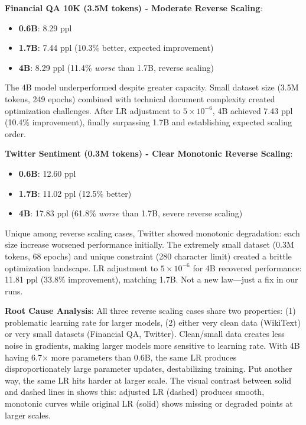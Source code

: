 \textbf{Financial QA 10K (3.5M tokens) - Moderate Reverse Scaling}:
\begin{itemize}
\item \textbf{0.6B}: 8.29 ppl
\item \textbf{1.7B}: 7.44 ppl (10.3\% better, expected improvement)
\item \textbf{4B}: 8.29 ppl (11.4\% \textit{worse} than 1.7B, reverse scaling)
\end{itemize}

The 4B model underperformed despite greater capacity. Small dataset size (3.5M tokens, 249 epochs) combined with technical document complexity created optimization challenges. After LR adjustment to $5 \times 10^{-6}$, 4B achieved 7.43 ppl (10.4\% improvement), finally surpassing 1.7B and establishing expected scaling order.

\textbf{Twitter Sentiment (0.3M tokens) - Clear Monotonic Reverse Scaling}:
\begin{itemize}
\item \textbf{0.6B}: 12.60 ppl
\item \textbf{1.7B}: 11.02 ppl (12.5\% better)
\item \textbf{4B}: 17.83 ppl (61.8\% \textit{worse} than 1.7B, severe reverse scaling)
\end{itemize}

Unique among reverse scaling cases, Twitter showed monotonic degradation: each size increase worsened performance initially. The extremely small dataset (0.3M tokens, 68 epochs) and unique constraint (280 character limit) created a brittle optimization landscape. LR adjustment to $5 \times 10^{-6}$ for 4B recovered performance: 11.81 ppl (33.8\% improvement), matching 1.7B. Not a new law—just a fix in our runs.

\textbf{Root Cause Analysis}: All three reverse scaling cases share two properties: (1) problematic learning rate for larger models, (2) either very clean data (WikiText) or very small datasets (Financial QA, Twitter). Clean/small data creates less noise in gradients, making larger models more sensitive to learning rate. With 4B having 6.7$\times$ more parameters than 0.6B, the same LR produces disproportionately large parameter updates, destabilizing training. Put another way, the same LR hits harder at larger scale. The visual contrast between solid and dashed lines in  shows this: adjusted LR (dashed) produces smooth, monotonic curves while original LR (solid) shows missing or degraded points at larger scales.

